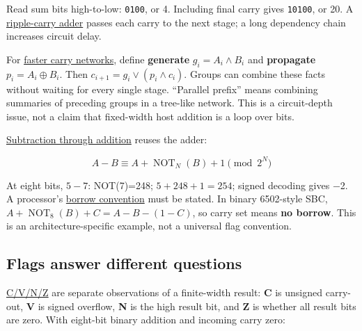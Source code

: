 Read sum bits high-to-low: \texttt{0100}, or 4. Including final carry gives \texttt{10100}, or 20. A \hyperref[appendix-17917d9fdbe3]{ripple-carry adder} passes each carry to the next stage; a long dependency chain increases circuit delay.

For \hyperref[appendix-b5c46b2d94ff]{faster carry networks}, define \textbf{generate} \(g_i=A_i\land B_i\) and \textbf{propagate} \(p_i=A_i\oplus B_i\). Then \(c_{i+1}=g_i\lor(p_i\land c_i)\). Groups can combine these facts without waiting for every single stage. ``Parallel prefix'' means combining summaries of preceding groups in a tree-like network. This is a circuit-depth issue, not a claim that fixed-width host addition is a loop over bits.

\hyperref[appendix-1c7df340573e]{Subtraction through addition} reuses the adder:

\[
A-B \equiv A+\operatorname{NOT}_N(B)+1\pmod{2^N}
\]

At eight bits, \(5-7\): NOT(7)=248; \(5+248+1=254\); signed decoding gives −2. A processor's \hyperref[appendix-d52d5f78ffd1]{borrow convention} must be stated. In binary 6502-style SBC, \(A+\operatorname{NOT}_8(B)+C=A-B-(1-C)\), so carry set means \textbf{no borrow}. This is an architecture-specific example, not a universal flag convention.

\subsection{Flags answer different questions}\label{01-foundations-i-ch001-flags-answer-different-questions}

\hyperref[appendix-8d687c9c08ab]{C/V/N/Z} are separate observations of a finite-width result: \textbf{C} is unsigned carry-out, \textbf{V} is signed overflow, \textbf{N} is the high result bit, and \textbf{Z} is whether all result bits are zero. With eight-bit binary addition and incoming carry zero:

